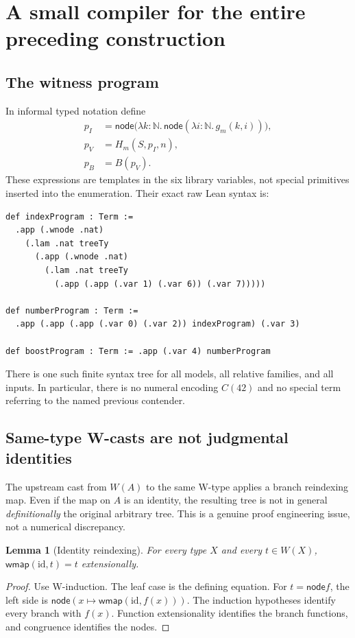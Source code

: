 \documentclass[11pt,letterpaper]{article}
\newtheorem{lemma}[theorem]{Lemma}
\theoremstyle{definition}
\newcommand{\N}{\mathbb N}
\newcommand{\node}{\mathsf{node}}
\begin{document}
\section{A small compiler for the entire preceding construction}
\label{sec:compiler}

\subsection{The witness program}

In informal typed notation define
\begin{align}
 p_I&=\node\bigl(\lambda k:\N.\,
                    \node(\lambda i:\N.\,g_m(k,i))\bigr),\\
 p_V&=H_m(S,p_I,n),\\
 p_B&=B(p_V).
\label{eq:compiler}
\end{align}
These expressions are templates in the six library variables, not special
primitives inserted into the enumeration. Their exact raw Lean syntax is:
\begin{lstlisting}
def indexProgram : Term :=
  .app (.wnode .nat)
    (.lam .nat treeTy
      (.app (.wnode .nat)
        (.lam .nat treeTy
          (.app (.app (.var 1) (.var 6)) (.var 7)))))

def numberProgram : Term :=
  .app (.app (.app (.var 0) (.var 2)) indexProgram) (.var 3)

def boostProgram : Term := .app (.var 4) numberProgram
\end{lstlisting}

There is one such finite syntax tree for all models, all relative families,
and all inputs. In particular, there is no numeral encoding $C(42)$ and no
special term referring to the named previous contender.

\subsection{Same-type W-casts are not judgmental identities}

The upstream cast from $W(A)$ to the same W-type applies a branch reindexing
map. Even if the map on $A$ is an identity, the resulting tree is not in general
\emph{definitionally} the original arbitrary tree. This is a genuine proof
engineering issue, not a numerical discrepancy.

\begin{lemma}[Identity reindexing]
\label{lem:wmap}
For every type $X$ and every $t\in W(X)$,
$\mathsf{wmap}(\mathrm{id},t)=t$ extensionally.
\end{lemma}
\begin{proof}
Use W-induction. The leaf case is the defining equation. For $t=\node f$, the
left side is $\node(x\mapsto\mathsf{wmap}(\mathrm{id},f(x)))$. The induction
hypotheses identify every branch with $f(x)$. Function extensionality identifies
the branch functions, and congruence identifies the nodes.
\end{proof}
\end{document}
